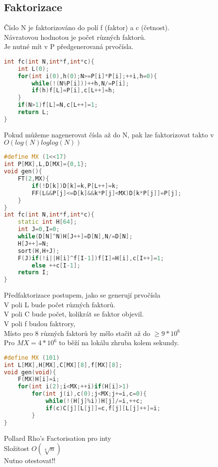 \documentclass[11pt]{article}
\begin{document}
\subsection{Faktorizace}
Číslo \textsf{N} je faktorizováno do polí \textsf{f} (faktor) a \textsf{c} (četnost).
\\Návratovou hodnotou je počet různých faktorů.
\\Je nutné mít v \textsf{P} předgenerovaná prvočísla.
\begin{lstlisting}[language=C++]
int fc(int N,int*f,int*c){
    int L(0);
    for(int i(0),h(0);N>=P[i]*P[i];++i,h=0){
        while(!(N%P[i]))++h,N/=P[i];
        if(h)f[L]=P[i],c[L++]=h;
    }
    if(N>1)f[L]=N,c[L++]=1;
    return L;
}
\end{lstlisting}
Pokud můžeme nagenerovat čísla až do \textsf{N}, pak lze faktorizovat takto v $O(log(N)loglog(N))$
\begin{lstlisting}[language=C++]
#define MX (1<<17)
int P[MX],L,D[MX]={0,1};
void gen(){
    FT(2,MX){
        if(!D[k])D[k]=k,P[L++]=k;
        FF(L&&P[j]<=D[k]&&k*P[j]<MX)D[k*P[j]]=P[j];
    }
}
int fc(int N,int*f,int*c){
    static int H[64];
    int J=0,I=0;
    while(D[N]^N)H[J++]=D[N],N/=D[N];
    H[J++]=N;
    sort(H,H+J);
    F(J)if(!i||H[i]^f[I-1])f[I]=H[i],c[I++]=1;
        else ++c[I-1];
    return I;
}
\end{lstlisting}
Předfaktorizace postupem, jako se generují prvočísla
\\V poli \textsf{L} bude počet různých faktorů.
\\V poli \textsf{C} bude počet, kolikrát se faktor objevil.
\\V poli \textsf{f} budou faktrory,
\\Místo pro 8 různých faktorů by mělo stačit až do $\geq 9*10^6$
\\Pro $MX=4*10^6$ to běží na lokálu zhruba kolem sekundy. 
\begin{lstlisting}[language=C++]
#define MX (101)
int L[MX],H[MX],C[MX][8],f[MX][8];
void gen(void){
    F(MX)H[i]=i;
    for(int i(2);i<MX;++i)if(H[i]>1)
        for(int j(i),c(0);j<MX;j+=i,c=0){
            while(!(H[j]%i))H[j]/=i,++c;
            if(c)C[j][L[j]]=c,f[j][L[j]++]=i;
        }
}
\end{lstlisting}
Pollard Rho's Factorisation pro inty
\\Složitost $O(\sqrt[4]{n})$
\\Nutno otestovat!!
\end{document}
